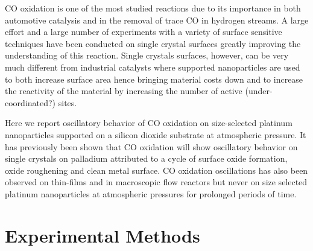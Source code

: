 \documentclass[8.5pt,twoside,twocolumn]{article}
\begin{document}



CO oxidation is one of the most studied reactions due to its importance in both automotive catalysis and in the removal of trace CO in hydrogen streams. A large effort and a large number of experiments with a variety of surface sensitive techniques have been conducted on single crystal surfaces greatly improving the understanding of this reaction. Single crystals surfaces, however, can be very much different from industrial catalysts where supported nanoparticles are used to both increase surface area hence bringing material costs down and to increase the reactivity of the material by increasing the number of active (under-coordinated?) sites. 

Here we report oscillatory behavior of CO oxidation on size-selected platinum nanoparticles supported on a silicon dioxide substrate at atmospheric pressure. It has previously been shown that CO oxidation will show oscillatory behavior on single crystals on palladium \cite{Hendriksen2010} attributed to a cycle of surface oxide formation, oxide roughening and clean metal surface. CO oxidation oscillations has also been observed on thin-films \cite{Lund2000} and in macroscopic flow reactors \cite{Singh2010} but never on size selected platinum nanoparticles at atmospheric pressures for prolonged periods of time.

\section{Experimental Methods}
\end{document}
